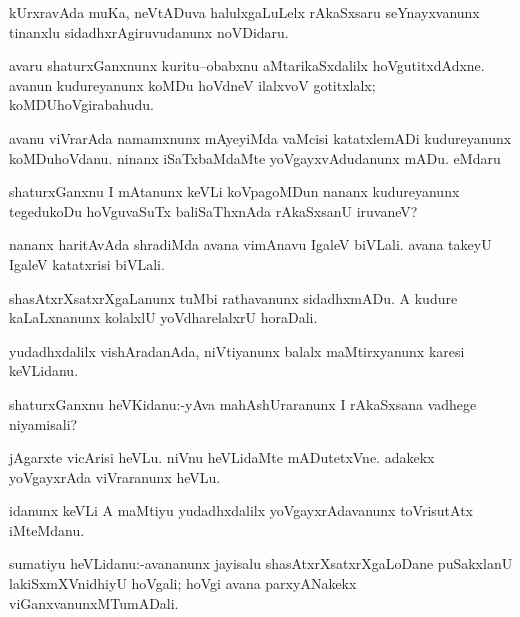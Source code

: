 \documentclass{article}
\begin{document}
\begin{mn}%
kUrxravAda muKa, neVtADuva halulxgaLuLelx rAkaSxsaru seYnayxvanunx tinanxlu 
sidadhxrAgiruvudanunx noVDidaru.
\end{mn}

\begin{mn}%
avaru shaturxGanxnunx kuritu--obabxnu aMtarikaSxdalilx hoVgutitxdAdxne. avanun 
kudureyanunx koMDu hoVdneV ilalxvoV gotitxlalx; koMDUhoVgirabahudu.
\end{mn}

\begin{mn}%
avanu viVrarAda namamxnunx mAyeyiMda vaMcisi katatxlemADi kudureyanunx koMDuhoVdanu. ninanx 
iSaTxbaMdaMte yoVgayxvAdudanunx mADu. eMdaru
\end{mn}

\begin{mn}%
shaturxGanxnu I mAtanunx keVLi koVpagoMDun nananx kudureyanunx tegedukoDu hoVguvaSuTx 
baliSaThxnAda rAkaSxsanU iruvaneV?
\end{mn}

\begin{mn}%
nananx haritAvAda shradiMda avana vimAnavu IgaleV biVLali. avana takeyU IgaleV katatxrisi 
biVLali.
\end{mn}

\begin{mn}%
shasAtxrXsatxrXgaLanunx tuMbi rathavanunx sidadhxmADu. A kudure kaLaLxnanunx kolalxlU 
yoVdharelalxrU horaDali.
\end{mn}

\begin{mn}%
yudadhxdalilx vishAradanAda, niVtiyanunx balalx maMtirxyanunx karesi keVLidanu.
\end{mn}

\begin{mn}%
shaturxGanxnu heVKidanu:-yAva mahAshUraranunx I rAkaSxsana vadhege niyamisali?
\end{mn}

\begin{mn}%
jAgarxte vicArisi heVLu. niVnu heVLidaMte mADutetxVne. adakekx yoVgayxrAda viVraranunx heVLu.
\end{mn}

\begin{mn}%
idanunx keVLi A maMtiyu yudadhxdalilx yoVgayxrAdavanunx toVrisutAtx iMteMdanu.
\end{mn}

\begin{mn}%
sumatiyu heVLidanu:-avananunx jayisalu shasAtxrXsatxrXgaLoDane puSakxlanU lakiSxmXVnidhiyU 
hoVgali; hoVgi avana parxyANakekx viGanxvanunxMTumADali.
\end{mn}
\end{document}
